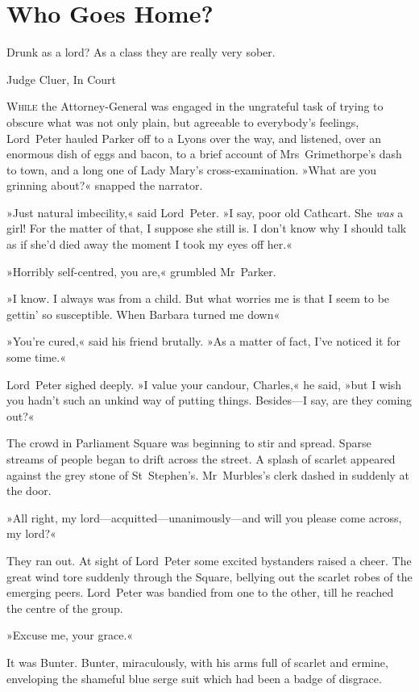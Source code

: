 
\chapter{Who Goes Home?}

\epigraph{Drunk as a lord? As a class they are really very sober.}{Judge Cluer, In Court}


\lettrine[lines=4]{W}{hile} the Attorney-General was engaged in the ungrateful task of trying to obscure what was not only plain, but agreeable to everybody's feelings, Lord~Peter hauled Parker off to a Lyons over the way, and listened, over an enormous dish of eggs and bacon, to a brief account of Mrs~Grimethorpe's dash to town, and a long one of Lady Mary's cross-examination.
»What are you grinning about?« snapped the narrator.

»Just natural imbecility,« said Lord~Peter. »I say, poor old Cathcart.  She \textit{was} a girl! For the matter of that, I suppose she still is. I don't know why I should talk as if she'd died away the moment I took my eyes off her.«

»Horribly self-centred, you are,« grumbled Mr~Parker.

»I know. I always was from a child. But what worries me is that I seem to be gettin' so susceptible. When Barbara turned me down\longdash«

»You're cured,« said his friend brutally. »As a matter of fact, I've noticed it for some time.«

Lord~Peter sighed deeply. »I value your candour, Charles,« he said, »but I wish you hadn't such an unkind way of putting things. Besides—I say, are they coming out?«

The crowd in Parliament Square was beginning to stir and spread. Sparse streams of people began to drift across the street. A splash of scarlet appeared against the grey stone of St~Stephen's. Mr~Murbles's clerk dashed in suddenly at the door.

»All right, my lord—acquitted—unanimously—and will you please come across, my lord?«

They ran out. At sight of Lord~Peter some excited bystanders raised a cheer. The great wind tore suddenly through the Square, bellying out the scarlet robes of the emerging peers. Lord~Peter was bandied from one to the other, till he reached the centre of the group.

»Excuse me, your grace.«

It was Bunter. Bunter, miraculously, with his arms full of scarlet and ermine, enveloping the shameful blue serge suit which had been a badge of disgrace.

